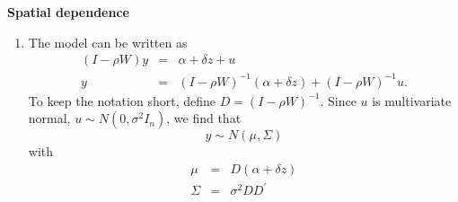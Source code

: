 \begin{Solution}{12.14}
\textbf{Spatial dependence }

\begin{enumerate}
\item The model can be written as%
\begin{eqnarray*}
\left( I-\rho W\right) y &=&\alpha +\delta z+u \\
y &=&\left( I-\rho W\right) ^{-1}\left( \alpha +\delta z\right) +\left(
I-\rho W\right) ^{-1}u.
\end{eqnarray*}%
To keep the notation short, define $D=\left( I-\rho W\right) ^{-1}$. Since $u
$ is multivariate normal, $u\sim N(0,\sigma ^{2}I_{n})$, we find that%
\begin{equation*}
y\sim N\left( \mu ,\Sigma \right)
\end{equation*}%
with%
\begin{eqnarray*}
\mu  &=&D\left( \alpha +\delta z\right)  \\
\Sigma  &=&\sigma ^{2}DD^{\prime }
\end{eqnarray*}


\end{enumerate}
\end{Solution}

